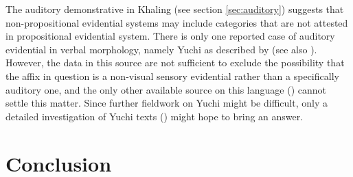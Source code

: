 \documentclass[oneside,a4paper,11pt]{article}
\begin{document}
The auditory demonstrative in Khaling (see section \ref{sec:auditory}) suggests that non-propositional evidential systems may include categories that are not attested in propositional evidential system. There is only one reported case of auditory evidential in verbal morphology, namely  Yuchi as described by \citet{linn01euchee} (see also \citealt[37]{aikhenvald06}). However, the data in this source are not sufficient to exclude the possibility that the affix in question is a non-visual sensory evidential rather than a specifically auditory one, and the only other available source on this language (\citealt{wagner38yuchi}) cannot settle this matter. Since further fieldwork on Yuchi might be difficult, only a detailed investigation of Yuchi texts (\citealt{wagner31tales}) might hope to bring an answer.



\section{Conclusion}




\end{document}
